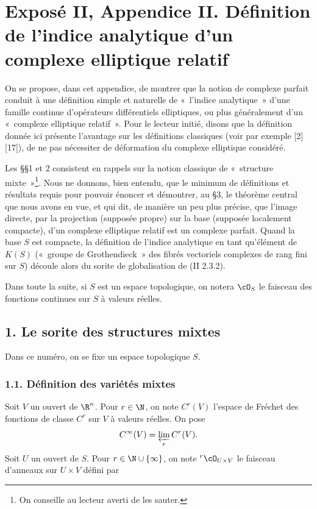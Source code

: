 \section*{Exposé II, Appendice II. Définition de l'indice analytique d'un complexe elliptique relatif}

On se propose, dans cet appendice, de montrer que la notion de complexe parfait conduit à une définition simple et naturelle de «~l'indice analytique~» d'une famille continue d'opérateurs différentiels elliptiques, ou plus généralement d'un «~complexe elliptique relatif~». Pour le lecteur initié, disons que la définition donnée ici présente l'avantage sur les définitions classiques (voir par exemple [2][17]), de ne pas nécessiter de déformation du complexe elliptique considéré.

Les §§1 et 2 consistent en rappels sur la notion classique de «~structure mixte~»\footnote{On conseille au lecteur averti de les sauter.}. Nous ne donnons, bien entendu, que le minimum de définitions et résultats requis pour pouvoir énoncer et démontrer, au §3, le théorème central que nous avons en vue, et qui dit, de manière un peu plus précise, que l'image directe, par la projection (supposée propre) sur la base (supposée localement compacte), d'un complexe elliptique relatif est un complexe parfait. Quand la base $S$ est compacte, la définition de l'indice analytique en tant qu'élément de $K(S)$ («~groupe de Grothendieck~» des fibrés vectoriels complexes de rang fini sur $S$) découle alors du sorite de globalisation de (II 2.3.2).

Dans toute la suite, si $S$ est un espace topologique, on notera $\cO_S$ le faisceau des fonctions continues sur $S$ à valeurs réelles.

\subsection*{1. Le sorite des structures mixtes}

Dans ce numéro, on se fixe un espace topologique $S$.

\subsubsection*{1.1. Définition des variétés mixtes}
Soit $V$ un ouvert de $\R^n$. Pour $r\in\N$, on note $C^r(V)$ l'espace de Fréchet des fonctions de classe $C^r$ sur $V$ à valeurs réelles. On pose
\[
  C^\infty(V)=\varprojlim_r C^r(V).
\]
Soit $U$ un ouvert de $S$. Pour $r\in\N\cup\{\infty\}$, on note ${}^r\cO_{U\times V}$ le faisceau d'anneaux sur $U\times V$ défini par
